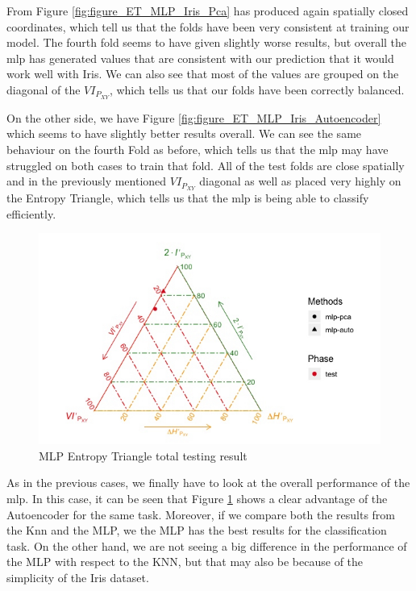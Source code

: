 From Figure \ref{fig:figure_ET_MLP_Iris_Pca} has produced again spatially closed coordinates, which tell us that the folds have been very consistent at training our model. The fourth fold seems to have given slightly worse results, but overall the mlp has generated values that are consistent with our prediction that it would work well with Iris. We can also see that most of the values are grouped on the diagonal of the $VI_{P_{XY}}$, which tells us that our folds have been correctly balanced. \par

On the other side, we have Figure \ref{fig:figure_ET_MLP_Iris_Autoencoder} which seems to have slightly better results overall. We can see the same behaviour on the fourth Fold as before, which tells us that the mlp may have struggled on both cases to train that fold. All of the test folds are close spatially and in the previously mentioned $VI_{P_{XY}}$ diagonal as well as placed very highly on the Entropy Triangle, which tells us that the mlp is being able to classify efficiently. \par
 
 
\begin{figure}[H]
	
	\includegraphics[width=1\linewidth]{Figuras_tfg/ET_Total_Iris_Mlp}
	\caption{MLP Entropy Triangle total testing result}
	\label{fig:figure_ET_Total_MLP_Iris}
\end{figure}

As in the previous cases, we finally have to look at the overall performance of the mlp. In this case, it can be seen that Figure \ref{fig:figure_ET_Total_MLP_Iris} shows a clear advantage of the Autoencoder for the same task. Moreover, if we compare both the results from the Knn and the MLP, we the MLP has the best results for the classification task. On the other hand, we are not seeing a big difference in the performance of the MLP with respect to the KNN, but that may also be because of the simplicity of the Iris dataset.

